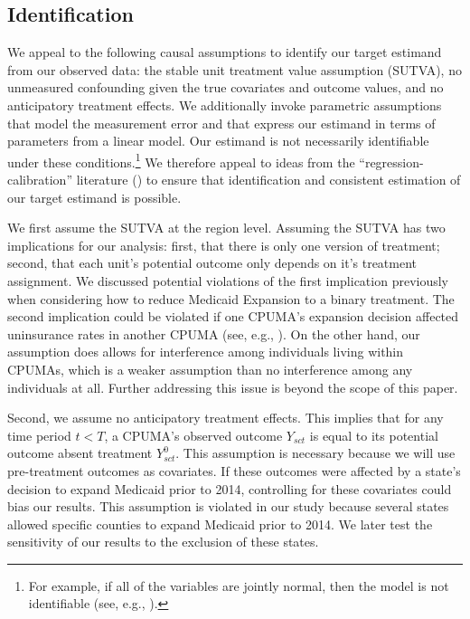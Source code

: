 \documentclass[aoas]{imsart}
\theoremstyle{plain}
\theoremstyle{remark}
\begin{document}
\subsection{Identification} \label{ssec:identification}

We appeal to the following causal assumptions to identify our target estimand from our observed data: the stable unit treatment value assumption (SUTVA), no unmeasured confounding given the true covariates and outcome values, and no anticipatory treatment effects. We additionally invoke parametric assumptions that model the measurement error and that express our estimand in terms of parameters from a linear model. Our estimand is not necessarily identifiable under these conditions.\footnote{For example, if all of the variables are jointly normal, then the model is not identifiable (see, e.g., \cite{cheng1999statistical}).} We therefore appeal to ideas from the ``regression-calibration'' literature (\cite{gleser1992importance}) to ensure that identification and consistent estimation of our target estimand is possible.

We first assume the SUTVA at the region level. Assuming the SUTVA has two implications for our analysis: first, that there is only one version of treatment; second, that each unit's potential outcome only depends on it's treatment assignment. We discussed potential violations of the first implication previously when considering how to reduce Medicaid Expansion to a binary treatment. The second implication could be violated if one CPUMA's expansion decision affected uninsurance rates in another CPUMA (see, e.g., \cite{frean2017premium}). On the other hand, our assumption does allows for interference among individuals living within CPUMAs, which is a weaker assumption than no interference among any individuals at all. Further addressing this issue is beyond the scope of this paper.

Second, we assume no anticipatory treatment effects. This implies that for any time period $t < T$, a CPUMA's observed outcome $Y_{sct}$ is equal to its potential outcome absent treatment $Y_{sct}^0$. This assumption is necessary because we will use pre-treatment outcomes as covariates. If these outcomes were affected by a state's decision to expand Medicaid prior to 2014, controlling for these covariates could bias our results. This assumption is violated in our study because several states allowed specific counties to expand Medicaid prior to 2014. We later test the sensitivity of our results to the exclusion of these states.
\end{document}
